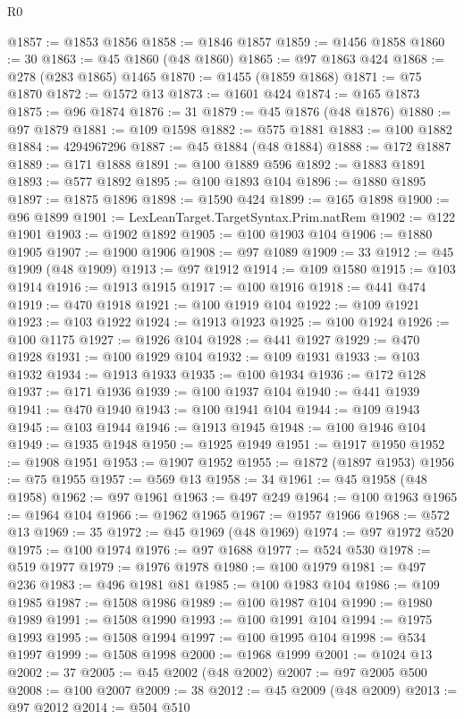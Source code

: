 \begin{lexlean}{R0}
\begin{coremodule}
@1857 := @1853 @1856
@1858 := @1846 @1857
@1859 := @1456 @1858
@1860 := 30
@1863 := @45 @1860 (@48 @1860)
@1865 := @97 @1863 @424
@1868 := @278 (@283 @1865) @1465
@1870 := @1455 (@1859 @1868)
@1871 := @75 @1870
@1872 := @1572 @13
@1873 := @1601 @424
@1874 := @165 @1873
@1875 := @96 @1874
@1876 := 31
@1879 := @45 @1876 (@48 @1876)
@1880 := @97 @1879
@1881 := @109 @1598
@1882 := @575 @1881
@1883 := @100 @1882
@1884 := 4294967296
@1887 := @45 @1884 (@48 @1884)
@1888 := @172 @1887
@1889 := @171 @1888
@1891 := @100 @1889 @596
@1892 := @1883 @1891
@1893 := @577 @1892
@1895 := @100 @1893 @104
@1896 := @1880 @1895
@1897 := @1875 @1896
@1898 := @1590 @424
@1899 := @165 @1898
@1900 := @96 @1899
@1901 := LexLeanTarget.TargetSyntax.Prim.natRem
@1902 := @122 @1901
@1903 := @1902 @1892
@1905 := @100 @1903 @104
@1906 := @1880 @1905
@1907 := @1900 @1906
@1908 := @97 @1089
@1909 := 33
@1912 := @45 @1909 (@48 @1909)
@1913 := @97 @1912
@1914 := @109 @1580
@1915 := @103 @1914
@1916 := @1913 @1915
@1917 := @100 @1916
@1918 := @441 @474
@1919 := @470 @1918
@1921 := @100 @1919 @104
@1922 := @109 @1921
@1923 := @103 @1922
@1924 := @1913 @1923
@1925 := @100 @1924
@1926 := @100 @1175
@1927 := @1926 @104
@1928 := @441 @1927
@1929 := @470 @1928
@1931 := @100 @1929 @104
@1932 := @109 @1931
@1933 := @103 @1932
@1934 := @1913 @1933
@1935 := @100 @1934
@1936 := @172 @128
@1937 := @171 @1936
@1939 := @100 @1937 @104
@1940 := @441 @1939
@1941 := @470 @1940
@1943 := @100 @1941 @104
@1944 := @109 @1943
@1945 := @103 @1944
@1946 := @1913 @1945
@1948 := @100 @1946 @104
@1949 := @1935 @1948
@1950 := @1925 @1949
@1951 := @1917 @1950
@1952 := @1908 @1951
@1953 := @1907 @1952
@1955 := @1872 (@1897 @1953)
@1956 := @75 @1955
@1957 := @569 @13
@1958 := 34
@1961 := @45 @1958 (@48 @1958)
@1962 := @97 @1961
@1963 := @497 @249
@1964 := @100 @1963
@1965 := @1964 @104
@1966 := @1962 @1965
@1967 := @1957 @1966
@1968 := @572 @13
@1969 := 35
@1972 := @45 @1969 (@48 @1969)
@1974 := @97 @1972 @520
@1975 := @100 @1974
@1976 := @97 @1688
@1977 := @524 @530
@1978 := @519 @1977
@1979 := @1976 @1978
@1980 := @100 @1979
@1981 := @497 @236
@1983 := @496 @1981 @81
@1985 := @100 @1983 @104
@1986 := @109 @1985
@1987 := @1508 @1986
@1989 := @100 @1987 @104
@1990 := @1980 @1989
@1991 := @1508 @1990
@1993 := @100 @1991 @104
@1994 := @1975 @1993
@1995 := @1508 @1994
@1997 := @100 @1995 @104
@1998 := @534 @1997
@1999 := @1508 @1998
@2000 := @1968 @1999
@2001 := @1024 @13
@2002 := 37
@2005 := @45 @2002 (@48 @2002)
@2007 := @97 @2005 @500
@2008 := @100 @2007
@2009 := 38
@2012 := @45 @2009 (@48 @2009)
@2013 := @97 @2012
@2014 := @504 @510

\end{coremodule}
\end{lexlean}
